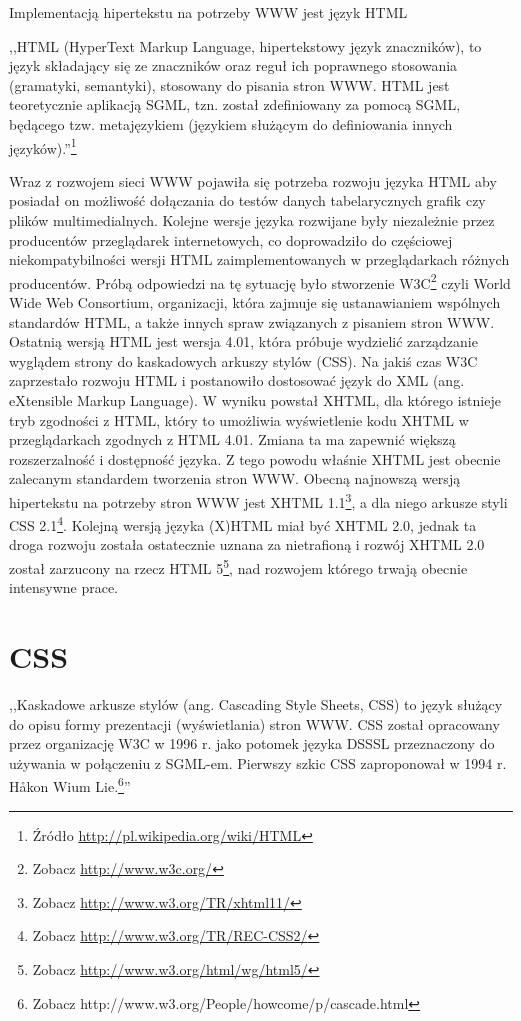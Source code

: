 \documentclass[a4paper,12pt,oneside]{report}
\begin{document}
Implementacją hipertekstu na potrzeby WWW jest język HTML 

,,HTML (HyperText Markup Language, hipertekstowy język znaczników), to język składający się ze znaczników oraz reguł ich poprawnego stosowania (gramatyki, semantyki), stosowany do pisania stron WWW. HTML jest teoretycznie aplikacją SGML, tzn. został zdefiniowany za pomocą SGML, będącego tzw. metajęzykiem (językiem służącym do definiowania innych języków).''\footnote{Źródło \url{http://pl.wikipedia.org/wiki/HTML}}

Wraz z rozwojem sieci WWW pojawiła się potrzeba rozwoju języka HTML aby posiadał on możliwość dołączania do testów danych tabelarycznych grafik czy plików multimedialnych. Kolejne wersje języka rozwijane były niezależnie przez producentów przeglądarek internetowych, co doprowadziło do częściowej  niekompatybilności wersji HTML zaimplementowanych w przeglądarkach różnych producentów. Próbą odpowiedzi na tę sytuację było stworzenie W3C\footnote{Zobacz \url{http://www.w3c.org/}} czyli World Wide Web Consortium, organizacji, która zajmuje się ustanawianiem wspólnych standardów HTML, a także innych spraw związanych z pisaniem stron WWW. Ostatnią wersją HTML jest wersja 4.01, która próbuje wydzielić zarządzanie wyglądem strony do kaskadowych arkuszy stylów (CSS). Na jakiś czas W3C zaprzestało rozwoju HTML i postanowiło dostosować język do XML (ang. eXtensible Markup Language). W wyniku powstał XHTML, dla którego istnieje tryb zgodności z HTML, który to umożliwia wyświetlenie kodu XHTML w przeglądarkach zgodnych z HTML 4.01. Zmiana ta ma zapewnić większą rozszerzalność i dostępność języka. Z tego powodu właśnie XHTML jest obecnie zalecanym standardem tworzenia stron WWW. Obecną najnowszą wersją hipertekstu na potrzeby stron WWW jest XHTML 1.1\footnote{Zobacz \url{http://www.w3.org/TR/xhtml11/}}, a dla niego arkusze styli CSS 2.1\footnote{Zobacz \url{http://www.w3.org/TR/REC-CSS2/}}. Kolejną wersją języka (X)HTML miał być XHTML 2.0, jednak ta droga rozwoju została ostatecznie uznana za nietrafioną i rozwój XHTML 2.0 został zarzucony na rzecz HTML 5\footnote{Zobacz \url{http://www.w3.org/html/wg/html5/}}, nad rozwojem którego trwają obecnie intensywne prace.

\section{CSS}
\label{sec:css}
,,Kaskadowe arkusze stylów (ang. Cascading Style Sheets, CSS) to język służący do opisu formy prezentacji (wyświetlania) stron WWW. CSS został opracowany przez organizację W3C w 1996 r. jako potomek języka DSSSL przeznaczony do używania w połączeniu z SGML-em. Pierwszy szkic CSS zaproponował w 1994 r. Håkon Wium Lie.\footnote{Zobacz http://www.w3.org/People/howcome/p/cascade.html}''
\end{document}
